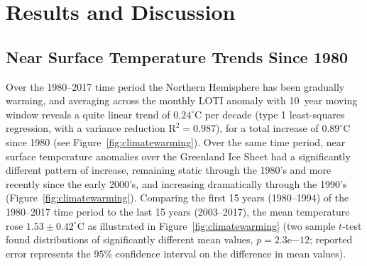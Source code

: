 \documentclass[11pt]{report}
\begin{document}
 \section{Results and Discussion}
 
 \subsection{Near Surface Temperature Trends Since 1980}
 
 Over the 1980--2017 time period the Northern Hemisphere has been gradually warming, and averaging across the monthly LOTI anomaly with 10~year moving window reveals a quite linear trend of $0.24^{\circ}$C per decade (type 1 least-squares regression, with a variance reduction $\mathrm{R^2}=0.987$), for a total increase of $0.89^{\circ}$C since 1980 (see Figure~\ref{fig:climatewarming}). Over the same time period, near surface temperature anomalies over the Greenland Ice Sheet had a significantly different pattern of increase, remaining static through the 1980's and more recently since the early 2000's, and increasing dramatically through the 1990's (Figure~\ref{fig:climatewarming}). Comparing the first 15 years (1980--1994) of the 1980--2017 time period to the last 15 years (2003--2017), the mean temperature rose $1.53\pm0.42^{\circ}$C as illustrated in Figure~\ref{fig:climatewarming} (two sample $t$-test found distributions of significantly different mean values, $p = 2.3\mathrm{e}{-12}$; reported error represents the $95\%$ confidence interval on the difference in mean values). 
 
\end{document}
